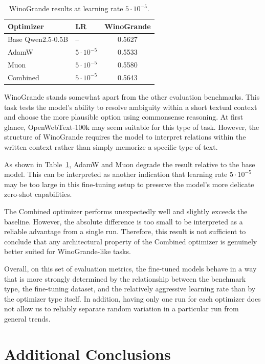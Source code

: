 \documentclass{article}
\begin{document}
\begin{table}[ht]
\centering
\begin{tabular}{llc}
\toprule
Optimizer & LR & WinoGrande \\
\midrule
Base Qwen2.5-0.5B & -- & 0.5627 \\
\midrule
AdamW    & $5 \cdot 10^{-5}$ & 0.5533 \\
Muon     & $5 \cdot 10^{-5}$ & 0.5580 \\
Combined & $5 \cdot 10^{-5}$ & 0.5643 \\
\bottomrule
\end{tabular}
\caption{WinoGrande results at learning rate $5 \cdot 10^{-5}$.}
\label{tab:winogrande-results}
\end{table}

WinoGrande stands somewhat apart from the other evaluation benchmarks. This task
tests the model's ability to resolve ambiguity within a short textual context and
choose the more plausible option using commonsense reasoning. At first glance,
OpenWebText-100k may seem suitable for this type of task. However, the structure of WinoGrande requires the model to
interpret relations within the written context rather than simply memorize a
specific type of text.

As shown in Table~\ref{tab:winogrande-results}, AdamW and Muon degrade the result
relative to the base model. This can be interpreted as another indication that
learning rate $5 \cdot 10^{-5}$ may be too large in this fine-tuning setup to
preserve the model's more delicate zero-shot capabilities.

The Combined optimizer performs unexpectedly well and slightly exceeds the
baseline. However, the absolute difference is too small to be interpreted as a
reliable advantage from a single run. Therefore, this result is not sufficient to
conclude that any architectural property of the Combined optimizer is genuinely
better suited for WinoGrande-like tasks.

Overall, on this set of evaluation metrics, the fine-tuned models behave in a
way that is more strongly determined by the relationship between the benchmark
type, the fine-tuning dataset, and the relatively aggressive learning rate than
by the optimizer type itself. In addition, having only one run for each optimizer
does not allow us to reliably separate random variation in a particular run from
general trends.

\section{Additional Conclusions}
\end{document}
